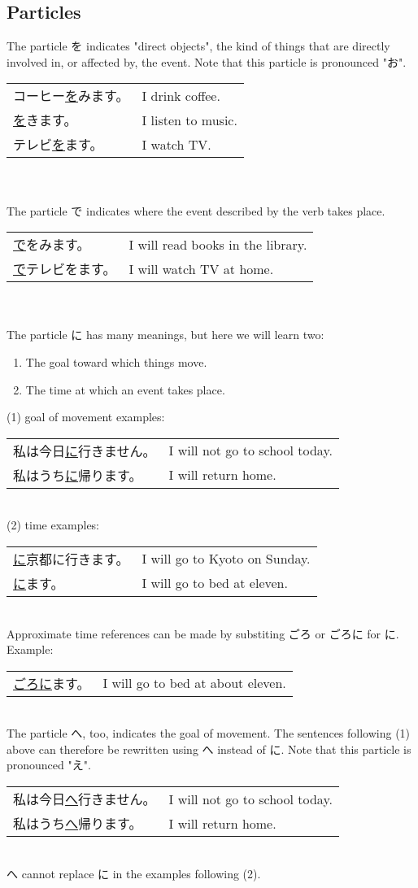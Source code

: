 \documentclass{article}
\newenvironment{gex}
{
	\,\\
	\renewcommand{\arraystretch}{1.5}
    \begin{tabular}{m{20em} l}
}
{
	\end{tabular}
	\renewcommand{\arraystretch}{1}
	\\
}
\begin{document}
   \subsection{Particles}
   The particle を indicates "direct objects", the kind of things that are directly involved in, or affected by, the event. Note that this particle is pronounced "お".
   \begin{gex}
   コーヒー\underline{を}\ruby{飲}{の}みます。 & I drink coffee. \\
   \ruby{音楽}{おんがく}\underline{を}\ruby{聞}{き}きます。 & I listen to music. \\
   テレビ\underline{を}\ruby{見}{み}ます。 & I watch TV.
   \end{gex}      
   \\
   The particle で indicates where the event described by the verb takes place.
   \begin{gex}
   \ruby{図}{と}\ruby{書}{しょ}\ruby{館}{かん}\underline{で}\ruby{本}{ほん}を\ruby{読}{よ}みます。 & I will read books in the library. \\
   \ruby{家}{うち}\underline{で}テレビを\ruby{見}{み}ます。 & I will watch TV at home.
   \end{gex}
   \\
   The particle に has many meanings, but here we will learn two:
   \begin{enumerate}
   \item The goal toward which things move. 
   \item The time at which an event takes place.
   \end{enumerate}
   (1) goal of movement examples:
   \begin{gex}
   私は今日\ruby{学校}{がっこう}\underline{に}行きません。 & I will not go to school today.\\
   私はうち\underline{に}帰ります。 & I will return home.
   \end{gex}
   (2) time examples:
   \begin{gex}
   \ruby{日}{にち}\ruby{曜}{よう}\ruby{日}{び}\underline{に}京都に行きます。 & I will go to Kyoto on Sunday. \\
   \ruby{十}{じゅう}\ruby{一}{いち}\ruby{時}{じ}\underline{に}\ruby{寝}{ね}ます。 & I will go to bed at eleven.
   \end{gex}
   Approximate time references can be made by substiting ごろ or ごろに for に. Example:
   \begin{gex}
   \ruby{十}{じゅう}\ruby{一}{いち}\ruby{時}{じ}\underline{ごろに}\ruby{寝}{ね}ます。 & I will go to bed at about eleven.
   \end{gex}
   The particle へ, too, indicates the goal of movement. The sentences following (1) above can therefore be rewritten using へ instead of に. Note that this particle is pronounced "え". 
   \begin{gex}
   私は今日\ruby{学校}{がっこう}\underline{へ}行きません。 & I will not go to school today.\\
   私はうち\underline{へ}帰ります。 & I will return home.
   \end{gex}
   へ cannot replace に in the examples following (2).
   
\end{document}
